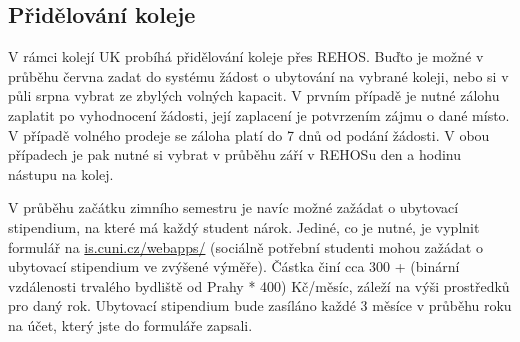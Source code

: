 \subsection{Přidělování koleje}
V rámci kolejí UK probíhá přidělování koleje přes REHOS. Buďto je možné v
průběhu června zadat do systému žádost o ubytování na vybrané koleji, nebo si v
půli srpna vybrat ze zbylých volných kapacit. V prvním případě je nutné zálohu
zaplatit po vyhodnocení žádosti, její zaplacení je potvrzením zájmu o dané
místo. V případě volného prodeje se záloha platí do 7 dnů od podání žádosti. V
obou případech je pak nutné si vybrat v průběhu září v REHOSu den a hodinu
nástupu na kolej.

V průběhu začátku zimního semestru je navíc možné zažádat o ubytovací
stipendium, na které má každý student nárok. Jediné, co je nutné, je vyplnit
formulář na \url{is.cuni.cz/webapps/} (sociálně potřební studenti mohou
zažádat o ubytovací stipendium ve zvýšené výměře). Částka činí cca 300 +
(binární vzdálenosti trvalého bydliště od Prahy * 400) Kč/měsíc, záleží na výši
prostředků pro daný rok. Ubytovací stipendium bude zasíláno každé 3 měsíce v
průběhu roku na účet, který jste do formuláře zapsali.